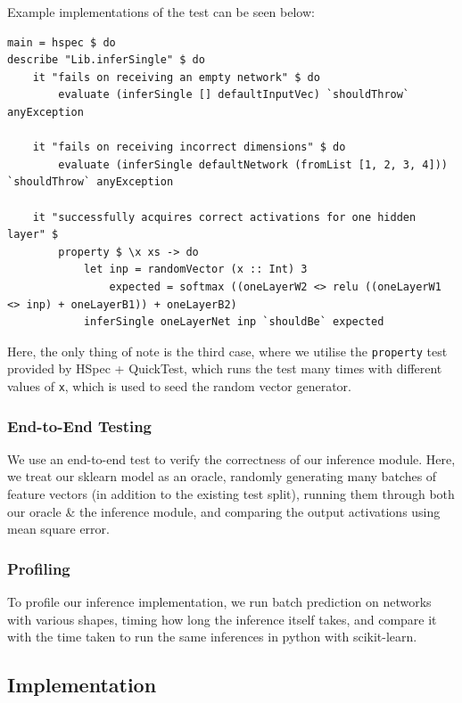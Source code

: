 \documentclass[12pt, titlepage]{article}
\begin{document}
Example implementations of the test can be seen below:
\begin{lstlisting}
main = hspec $ do
describe "Lib.inferSingle" $ do
	it "fails on receiving an empty network" $ do
		evaluate (inferSingle [] defaultInputVec) `shouldThrow` anyException

	it "fails on receiving incorrect dimensions" $ do
		evaluate (inferSingle defaultNetwork (fromList [1, 2, 3, 4])) `shouldThrow` anyException

	it "successfully acquires correct activations for one hidden layer" $
		property $ \x xs -> do
			let inp = randomVector (x :: Int) 3
				expected = softmax ((oneLayerW2 <> relu ((oneLayerW1 <> inp) + oneLayerB1)) + oneLayerB2)
			inferSingle oneLayerNet inp `shouldBe` expected
\end{lstlisting}
Here, the only thing of note is the third case, where we utilise the \verb|property| test provided by HSpec + QuickTest, which runs the test many times with different values of \verb|x|, which is used to seed the random vector generator.

\subsubsection{End-to-End Testing}\label{sec:8.2.2}
We use an end-to-end test to verify the correctness of our inference module. Here, we treat our sklearn model as an oracle, randomly generating many batches of feature vectors (in addition to the existing test split), running them through both our oracle \& the inference module, and comparing the output activations using mean square error.

\subsubsection{Profiling}
To profile our inference implementation, we run batch prediction on networks with various shapes, timing how long the inference itself takes, and compare it with the time taken to run the same inferences in python with scikit-learn.

\subsection{Implementation}
\end{document}
